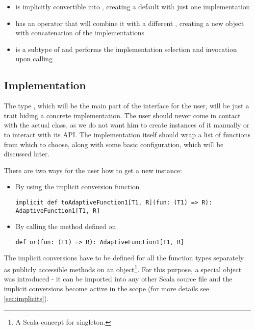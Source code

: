 \begin{itemize}
	\item {} is implicitly convertible into , creating a default with just one implementation
	\item {} has an operator  that will combine it with a different , creating a new object with concatenation of the implementations
	\item {} is a subtype of  and performs the implementation selection and invocation upon calling 
\end{itemize}

\subsection{Implementation}
\label{subsec:api_implementation}

The type , which will be the main part of the interface for the user, will be just a trait hiding a concrete implementation. The user should never come in contact with the actual class, as we do not want him to create instances of it manually or to interact with its API. The implementation itself should wrap a list of functions from which to choose, along with some basic configuration, which will be discussed later.

There are two ways for the user how to get a new  instance:

\begin{itemize}
	\item By using the implicit conversion function
	\lstset{style=Scala}
	\begin{lstlisting}
implicit def toAdaptiveFunction1[T1, R](fun: (T1) => R): AdaptiveFunction1[T1, R]
\end{lstlisting}
	\item By calling the  method defined on 
		\lstset{style=Scala}
	\begin{lstlisting}
def or(fun: (T1) => R): AdaptiveFunction1[T1, R]
	\end{lstlisting}
\end{itemize}

The implicit conversions have to be defined for all the function types separately as publicly accessible methods on an object\footnote{A Scala concept for singleton.}. For this purpose, a special object  was introduced - it can be imported into any other Scala source file and the implicit conversions become active in the scope (for more details see \ref{sec:implicits}).

